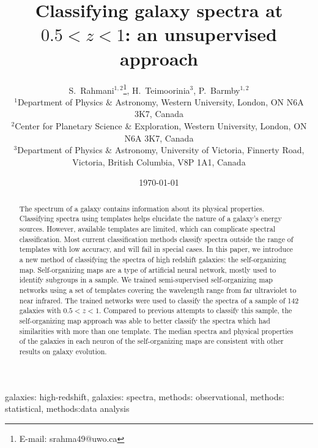 \documentclass[useAMS,usenatbib]{mn2e}
\begin{document}

\title[Classifying high-$z$ galaxy spectra]{Classifying galaxy spectra at $0.5<z<1$: an unsupervised approach}
\date{\today}
\author[S.~Rahmani, H.~Teimoorinia and P.~Barmby]{S.~Rahmani$^{1,2}$\thanks{E-mail:
srahma49@uwo.ca}, H.~Teimoorinia$^{3}$, P.~Barmby$^{1,2}$\\
$^{1}$Department of Physics $\&$ Astronomy, Western University, London, ON N6A 3K7, Canada\\
$^{2}$Center for Planetary Science \& Exploration, Western University, London, ON N6A 3K7, Canada\\
$^{3}$Department of Physics $\&$ Astronomy, University of Victoria, Finnerty Road, Victoria, British Columbia, V8P 1A1, Canada}
\maketitle


\begin{abstract}
    The spectrum of a galaxy contains information about its physical properties.
    Classifying spectra using templates helps elucidate the nature of a galaxy's energy sources.
    However, available templates are limited, which can complicate spectral classification.
    Most current classification methods classify spectra outside the range of templates with low accuracy, and will fail in special cases.
    In this paper, we introduce a new method of classifying the spectra
    of high redshift galaxies: the self-organizing map.
    Self-organizing maps are a type of artificial neural network, mostly used to identify subgroups in a sample.
    We trained semi-supervised self-organizing map networks using a set of
    templates covering the wavelength range from far ultraviolet to near infrared. 
    The trained networks were used to classify the spectra of a sample of 142 galaxies with $0.5 < z < 1$.
    Compared to previous attempts to classify this sample, the
    self-organizing map approach was able to better classify the spectra which had similarities with more than one template.
    The median spectra and physical properties of the galaxies in each neuron of the self-organizing maps are consistent with other results on galaxy evolution.

\end{abstract}
\begin{keywords} 
 galaxies: high-redshift, 
 galaxies: spectra, 
 methods: observational, 
 methods: statistical, 
 methods:data analysis
\end{keywords}
\end{document}

